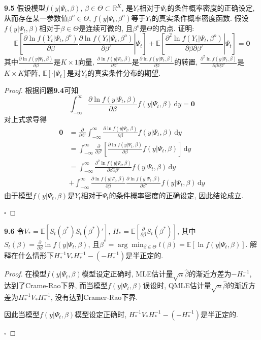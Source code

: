 \documentclass[cn,12pt,math=mtpro2,citestyle=gb7714-2015,bibstyle=gb7714-2015,twocol,mode=simple]{elegantbook}
\newcommand{\R}{\mathbb{R}}
\newcommand{\E}{\mathbb{E}}
\begin{document}
\textbf{9.5} 假设模型$f(y|\Psi_t,\beta)$, $\beta\in\Theta\subset\R^K$, 是$Y_t$相对于$\Psi_t$的条件概率密度的正确设定, 从而存在某一参数值$\beta^o\in\Theta$, $f(y|\Psi_t,\beta^o)$等于$Y_t$的真实条件概率密度函数. 假设$f(y|\Psi_t,\beta)$相对于$\beta\in\Theta$是连续可微的, 且$\beta^o$是$\Theta$的内点. 证明:
$$\E\left[\left.\frac{\partial \ln f(Y_t|\Psi_t,\beta^o)}{\partial\beta}\frac{\partial \ln f(Y_t|\Psi_t,\beta^o)}{\partial\beta'}\right|\Psi_t\right]+\E\left[\left.\frac{\partial^2\ln f(Y_t|\Psi_t,\beta^o)}{\partial\beta\partial\beta'}\right|\Psi_t\right]=\mathbf{0}$$
其中$\displaystyle \frac{\partial\ln f(y|\Psi_t,\beta)}{\partial\beta}$是$K\times1$向量, $\displaystyle \frac{\partial\ln f(y|\Psi_t,\beta)}{\partial\beta'}$是$\displaystyle \frac{\partial\ln f(y|\Psi_t,\beta)}{\partial\beta}$的转置, $\displaystyle\frac{\partial^2\ln f(y|\Psi_t,\beta)}{\partial\beta\partial\beta'}$是$K\times K$矩阵, $\E[\cdot|\Psi_t]$是对$Y_t$的真实条件分布的期望.
\begin{proof}
  根据问题\textbf{9.4}可知
  $$\displaystyle\int_{-\infty}^{\infty}\frac{\partial\ln f(y|\Psi_t,\beta)}{\partial\beta}f(y|\Psi_t,\beta)\,\text{d}y=\mathbf{0}$$
  对上式求导得
  \begin{align*}
 \mathbf{0}&= \frac{\partial}{\partial\beta'}\int_{-\infty}^{\infty}\frac{\partial\ln f(y|\Psi_t,\beta)}{\partial\beta}f(y|\Psi_t,\beta)\,\text{d}y \\
 &=\int_{-\infty}^{\infty}\frac{\partial}{\partial\beta'}\left[\frac{\partial\ln f(y|\Psi_t,\beta)}{\partial\beta}f(y|\Psi_t,\beta)\right]\,\text{d}y \\
 &=\int_{-\infty}^{\infty}\frac{\partial^2\ln f(y|\Psi_t,\beta)}{\partial\beta\partial\beta'}f(y|\Psi_t,\beta)\,\text{d}y\\
 &+\int_{-\infty}^{\infty}\frac{\partial\ln f(y|\Psi_t,\beta)}{\partial\beta}\frac{\partial \ln f(y|\Psi_t,\beta)}{\partial\beta'}f(y|\Psi_t,\beta)\,\text{d}y
  \end{align*}
  由于模型$f(y|\Psi_t,\beta)$是$Y_t$相对于$\Psi_t$的条件概率密度的正确设定, 因此结论成立.

  $\square$
\end{proof}

\textbf{9.6} 令$V_\ast=\E[S_t(\beta^\ast)S_t(\beta^\ast)']$, $\displaystyle H_\ast=\E\left[\frac{\partial}{\partial\beta}S_t(\beta^\ast)\right]$, 其中$\displaystyle S_t(\beta)=\frac{\partial}{\partial\beta}\ln f(y|\Psi_t,\beta)$, 且$\displaystyle \beta^\ast=\arg\min_{\beta\in\Theta}l(\beta)=\E[\ln f(y|\Psi_t,\beta)]$. 解释在什么情形下$H_\ast^{-1}V_\ast H_\ast^{-1}-(-H_{\ast}^{-1})$是半正定的.
\begin{proof}
  在模型$f(y|\Psi_t,\beta)$模型设定正确时, MLE估计量$\sqrt{n}\hat{\beta}$的渐近方差为$-H_\ast^{-1}$, 达到了Crame-Rao下界, 而当模型$f(y|\Psi_t,\beta)$误设时, QMLE估计量$\sqrt{n}\hat{\beta}$的渐近方差为$H_\ast^ {-1}V_\ast H_\ast^{-1}$, 没有达到Cramer-Rao下界.

  因此当模型$f(y|\Psi_t,\beta)$模型设定正确时, $H_\ast^ {-1}V_\ast H_\ast^{-1}-(-H_{\ast}^{-1})$是半正定的.

  $\square$
\end{proof}
\end{document}

